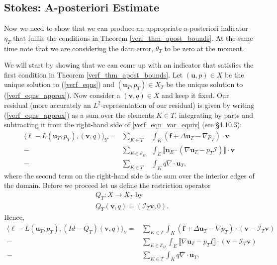 \documentclass[12pt,a4paper]{article}
\theoremstyle{definition}
\begin{document}
\subsection{Stokes: A-posteriori Estimate}

Now we need to show that we can produce an appropriate a-posteriori indicator $\eta_T$ that fulfils the conditions in Theorem \ref{verf_thm_apost_bounds}.  At the same time note that we are considering the data error, $\theta_T$ to be zero at the moment.

We will start by showing that we can come up with an indicator that satisfies the first condition in Theorem \ref{verf_thm_apost_bounds}.  Let $\left(\textbf{u},p\right)\in X$ be the unique solution to (\ref{verf_eqns}) and $\left(\textbf{u}_T,p_T\right)\in X_T$ be the unique solution to (\ref{verf_eqns_approx}).  Now consider a $\left(\textbf{v},q\right)\in X$ and keep it fixed.  Our residual (more accurately an $L^2$-representation of our residual) is given by writing (\ref{verf_eqns_approx}) as a sum over the elements $K\in T$, integrating by parts and subtracting it from the right-hand side of \ref{verf_eqn_var_equiv} (see \cite{verfurth2013posteriori} \S 4.10.3):
\begin{eqnarray}\label{L2-rep-residual}
\langle \ell -L\left(\textbf{u}_T,p_T\right),\left(\textbf{v},q\right) \rangle_Y= &\sum_{K\in T}&\int_{K}\left(\textbf{f}+\Delta \textbf{u}_T-\nabla p_T\right)\cdot \textbf{v}\nonumber\\-&\sum_{E\in \mathcal{E}_{\Omega}}&\int_{E}\llbracket\textbf{n}_E\cdot\left(\nabla \textbf{u}_T-p_T\mathcal{I}\right)\rrbracket \cdot \textbf{v}\\
-&\sum_{K\in T}&\int_{K}q \nabla \cdot \textbf{u}_T, \nonumber
\end{eqnarray}
where the second term on the right-hand side is the sum over the interior edges of the domain.   Before we proceed let us define the restriction operator 
\begin{equation}
\begin{aligned}
&Q_T:X\rightarrow X_T\text{ by}\\
&Q_T\left(\textbf{v},q\right)=\left(\mathcal{I}_T\textbf{v},0\right).
\end{aligned}
\end{equation}
Hence,
\begin{equation}\label{verf-a-posteriori-bound}
\begin{aligned}
\langle \ell -L\left(\textbf{u}_T,p_T\right),\left(Id-Q_T\right)\left(\textbf{v},q\right) \rangle_Y= &\sum_{K\in T}\int_{K}\left(\textbf{f}+\Delta \textbf{u}_T-\nabla p_T\right)\cdot \left(\textbf{v}-\mathcal{I}_T\textbf{v}\right)\\-&\sum_{E\in \mathcal{E}_{\Omega}}\int_{E}\llbracket\nabla \textbf{u}_T-p_TI\rrbracket \cdot \left(\textbf{v}-\mathcal{I}_T\textbf{v}\right)\\
-&\sum_{K\in T}\int_{K}q \nabla \cdot \textbf{u}_T, 
\end{aligned}
\end{equation}
\end{document}
